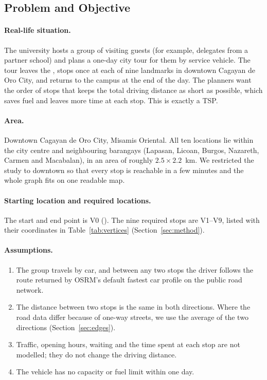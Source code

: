 \subsection{Problem and Objective}\label{sec:problem}

\paragraph{Real-life situation.} The university hosts a group of visiting guests (for example, delegates
from a partner school) and plans a one-day city tour for them by service vehicle. The tour leaves the
\textbf{\StartName}, stops once at each of nine landmarks in downtown Cagayan de Oro City, and
returns to the campus at the end of the day. The planners want the order of stops that keeps the total
driving distance as short as possible, which saves fuel and leaves more time at each stop. This is
exactly a TSP.

\paragraph{Area.} Downtown Cagayan de Oro City, Misamis Oriental. All ten locations lie within the
city centre and neighbouring barangays (Lapasan, Licoan, Burgos, Nazareth, Carmen and
Macabalan), in an area of roughly $2.5 \times 2.2$~km. We restricted the study to downtown so that
every stop is reachable in a few minutes and the whole graph fits on one readable map.

\paragraph{Starting location and required locations.} The start and end point is V0 (\StartName). The nine
required stops are V1--V9, listed with their coordinates in Table~\ref{tab:vertices}
(Section~\ref{sec:method}).

\paragraph{Assumptions.}
\begin{enumerate}
  \item The group travels by car, and between any two stops the driver follows the route returned by
        OSRM's default fastest car profile on the public road network.
  \item The distance between two stops is the same in both directions. Where the road data differ
        because of one-way streets, we use the average of the two directions (Section~\ref{sec:edges}).
  \item Traffic, opening hours, waiting and the time spent at each stop are not modelled; they do not
        change the driving distance.
  \item The vehicle has no capacity or fuel limit within one day.
\end{enumerate}

